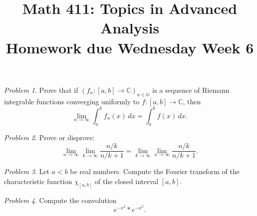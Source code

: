 \documentclass[11pt,twoside]{amsart}
\title{Math 411: Topics in Advanced Analysis\\ Homework due Wednesday Week 6}
\theoremstyle{plain}
\theoremstyle{remark}
\newtheorem{prob}{Problem}
\theoremstyle{definition}
\theoremstyle{definition}
\newcommand{\CC}{\mathbb{C}}
\newcommand{\NN}{\mathbb{N}}
\begin{document}
\maketitle

\begin{prob}
Prove that if $(f_n\colon [a,b]\to\CC)_{n\in \NN}$ is a sequence of Riemann integrable functions converging uniformly to $f\colon [a,b]\to \CC$, then
\[
  \lim_{n\to \infty} \int_a^b f_n(x)\,dx = \int_a^b f(x)\,dx.
\]
\end{prob}


\begin{prob}
Prove or disprove:
\[
  \lim_{n\to \infty}\lim_{k\to \infty} \frac{n/k}{n/k+1} = \lim_{k\to \infty}\lim_{n\to \infty} \frac{n/k}{n/k+1}.
\]
\end{prob}


\begin{prob}
Let $a<b$ be real numbers. Compute the Fourier transform of the characteristic function $\chi_{[a,b]}$ of the closed interval $[a,b]$.
\end{prob}


\begin{prob}
Compute the convolution
\[
  e^{-x^2}*e^{-x^2}.
\]
\end{prob}

\end{document}
